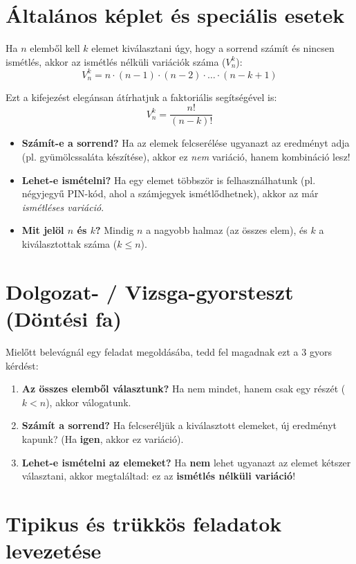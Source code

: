 \documentclass[11pt,a4paper]{article}
\begin{document}
\section{Általános képlet és speciális esetek}
Ha $n$ elemből kell $k$ elemet kiválasztani úgy, hogy a sorrend számít és nincsen ismétlés, akkor az ismétlés nélküli variációk száma ($V_n^k$):
\[
V_n^k = n \cdot (n-1) \cdot (n-2) \cdot \dots \cdot (n-k+1)
\]

Ezt a kifejezést elegánsan átírhatjuk a faktoriális segítségével is:
\[
V_n^k = \frac{n!}{(n-k)!}
\]

\begin{tcolorbox}[title=Gyakori csapdák és figyelmeztetések]
\begin{itemize}
    \item \textbf{Számít-e a sorrend?} Ha az elemek felcserélése ugyanazt az eredményt adja (pl. gyümölcssaláta készítése), akkor ez \emph{nem} variáció, hanem kombináció lesz!
    \item \textbf{Lehet-e ismételni?} Ha egy elemet többször is felhasználhatunk (pl. négyjegyű PIN-kód, ahol a számjegyek ismétlődhetnek), akkor az már \emph{ismétléses variáció}.
    \item \textbf{Mit jelöl $n$ és $k$?} Mindig $n$ a nagyobb halmaz (az összes elem), és $k$ a kiválasztottak száma ($k \le n$).
\end{itemize}
\end{tcolorbox}

\section{Dolgozat- / Vizsga-gyorsteszt (Döntési fa)}
Mielőtt belevágnál egy feladat megoldásába, tedd fel magadnak ezt a 3 gyors kérdést:
\begin{enumerate}
    \item \textbf{Az összes elemből választunk?} Ha nem mindet, hanem csak egy részét ($k < n$), akkor válogatunk.
    \item \textbf{Számít a sorrend?} Ha felcseréljük a kiválasztott elemeket, új eredményt kapunk? (Ha \textbf{igen}, akkor ez variáció).
    \item \textbf{Lehet-e ismételni az elemeket?} Ha \textbf{nem} lehet ugyanazt az elemet kétszer választani, akkor megtaláltad: ez az \textbf{ismétlés nélküli variáció}!
\end{enumerate}

\section{Tipikus és trükkös feladatok levezetése}
\end{document}

